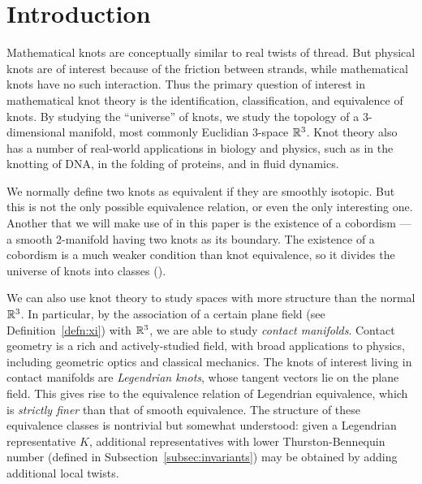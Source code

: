 \chapter{Introduction}\label{ch:intro}

Mathematical knots are conceptually similar to real twists of thread. But physical knots are of interest because of the friction between strands, while mathematical knots have no such interaction.
Thus the primary question of interest in mathematical knot theory is the identification, classification, and equivalence of knots. By studying the ``universe'' of knots, we study the topology of a 3-dimensional manifold, most commonly Euclidian 3-space $\mathbb{R}^3$. 
Knot theory also has a number of real-world applications in biology and physics, such as in the knotting of DNA, in the folding of proteins, and in fluid dynamics.

We normally define two knots as equivalent if they are smoothly isotopic.
But this is not the only possible equivalence relation, or even the only interesting one. Another that we will make use of in this paper is the existence of a cobordism --- a smooth 2-manifold having two knots as its boundary.
The existence of a cobordism is a much weaker condition than knot equivalence, so it divides the universe of knots into classes (\cite{fox-milnor}).

We can also use knot theory to study spaces with more structure than the normal $\mathbb{R}^3$. 
In particular, by the association of a certain plane field (see Definition~\ref{defn:xi}) with $\mathbb{R}^3$, we are able to study \emph{contact manifolds}. Contact geometry is a rich and actively-studied field, with broad applications to physics, including geometric optics and classical mechanics. The knots of interest living in contact manifolds are \emph{Legendrian knots}, whose tangent vectors lie on the plane field.
This gives rise to the equivalence relation of Legendrian equivalence, which is \emph{strictly finer} than that of smooth equivalence.
The structure of these equivalence classes is nontrivial but somewhat understood: given a Legendrian representative $K$, additional representatives with lower Thurston-Bennequin number (defined in Subsection~\ref{subsec:invariants}) may be obtained by adding additional local twists.


